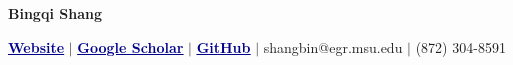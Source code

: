 \documentclass{resume}
\newcommand*{\git}{\vcenter{\hbox{\texttt{[image: icon/Git.png]}}}}
\newcommand*{\Google}{\vcenter{\hbox{\texttt{[image: icon/Google.png]}}}}
\newcommand*{\web}{\vcenter{\hbox{\texttt{[image: icon/Web.png]}}}}
\newcommand*{\phone}{\vcenter{\hbox{\texttt{[image: icon/Phone.png]}}}}
\begin{document}




\begin{center}
    \huge{\textbf{Bingqi Shang}}
    
    \vspace{0.2cm}
    \small
    \faGlobe\;\href{https://bio.bingqi-shang.com/}{\textcolor{darkblue}{\underline{\textbf{Website}}}} 
    \hspace{1mm}$|$\hspace{1mm}
    \faGraduationCap\;\href{https://scholar.google.com/citations?authuser=3&user=8xedwl0AAAAJ}{\textcolor{darkblue}{\bf\underline{Google Scholar}}} 
    \hspace{1mm}$|$\hspace{1mm}
    \faGithub\;\href{https://github.com/bshang17}{\textcolor{darkblue}{\bf\underline{GitHub}}}
    \hspace{1mm}$|$\hspace{1mm}
    \faEnvelope\;shangbin@egr.msu.edu
    \hspace{1mm}$|$\hspace{1mm}
    \faPhone\;(872) 304-8591
\end{center}
    
\end{document}
